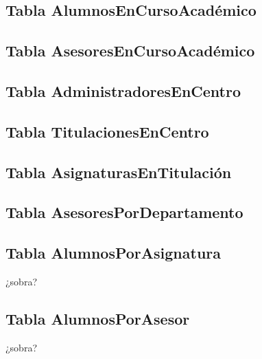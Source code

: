   \subsection{Tabla AlumnosEnCursoAcadémico}

  \subsection{Tabla AsesoresEnCursoAcadémico}

  \subsection{Tabla AdministradoresEnCentro}

  \subsection{Tabla TitulacionesEnCentro}

  \subsection{Tabla AsignaturasEnTitulación}

  \subsection{Tabla AsesoresPorDepartamento}

  \subsection{Tabla AlumnosPorAsignatura} ¿sobra?

  \subsection{Tabla AlumnosPorAsesor} ¿sobra?